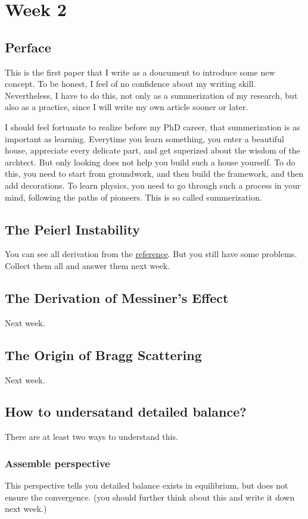 \documentclass[10pt,a4paper,openany]{book}
\newcommand{\abpath}{D:/大四/科研日志/website/}
\begin{document}
	\chapter{Week 2}
	\section{Perface}
	This is the first paper that I write as a doucument to introduce some new concept. To be honest, I feel of no confidence about my writing skill. Nevertheless, I have to do this, not only as a summerization of my research, but also as a practice, since I will write my own article sooner or later.
	
	I should feel fortunate to realize before my PhD career, that summerization is as important as learning. Everytime you learn something, you enter a beautiful house, appreciate every delicate part, and get superized about the wisdom of the archtect. But only looking does not help you build such a house yourself. To do this, you need to start from groundwork, and then build the framework, and then add decorations. To learn physics, you need to go through such a process in your mind, following the paths of pioneers. This is so called summerization.
	
\section{The Peierl Instability}
You can see all derivation from the \href{\abpath ref/27_Charge_density_wave.pdf}{reference}.
But you still have some problems. Collect them all and answer them next week.
\section{The Derivation of Messiner's Effect}
Next week.
\section{The Origin of Bragg Scattering}
Next week.
\section{How to undersatand detailed balance?}
There are at least two ways to understand this.
\subsection{Assemble perspective}
This perspective tells you detailed balance exists in equilibrium, but does not ensure the convergence. (you should further think about this and write it down next week.)
\end{document}
